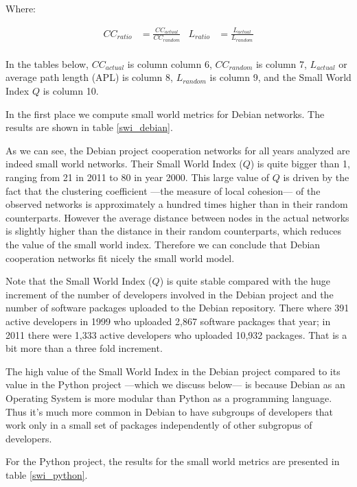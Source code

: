 Where:

\begin{align}
CC_{ratio}& = \frac{CC_{actual}}{CC_{random}} &
L_{ratio}& = \frac{L_{actual}}{L_{random}} \nonumber \\
\end{align}

In the tables below, $CC_{actual}$ is column column 6, $CC_{random}$ is column 7, $L_{actual}$ or average path length (APL) is column 8, $L_{random}$ is column 9, and the Small World Index $Q$ is column 10.

In the first place we compute small world metrics for Debian networks. The results are shown in table \ref{swi_debian}.



As we can see, the Debian project cooperation networks for all years analyzed are indeed small world networks. Their Small World Index ($Q$) is quite bigger than 1, ranging from 21 in 2011 to 80 in year 2000. This large value of $Q$ is driven by the fact that the clustering coefficient ---the measure of local cohesion--- of the observed networks is approximately a hundred times higher than in their random counterparts. However the average distance between nodes in the actual networks is slightly higher than the distance in their random counterparts, which reduces the value of the small world index. Therefore we can conclude that Debian cooperation networks fit nicely the small world model. 

Note that the Small World Index ($Q$) is quite stable compared with the huge increment of the number of developers involved in the Debian project and the number of software packages uploaded to the Debian repository. There where 391 active developers in 1999 who uploaded 2,867 software packages that year; in 2011 there were 1,333 active developers who uploaded 10,932 packages. That is a bit more than a three fold increment.

The high value of the Small World Index in the Debian project compared to its value in the Python project ---which we discuss below--- is because Debian as an Operating System is more modular than Python as a programming language. Thus it's much more common in Debian to have subgroups of developers that work only in a small set of packages independently of other subgropus of developers.

For the Python project, the results for the small world metrics are presented in table \ref{swi_python}.

